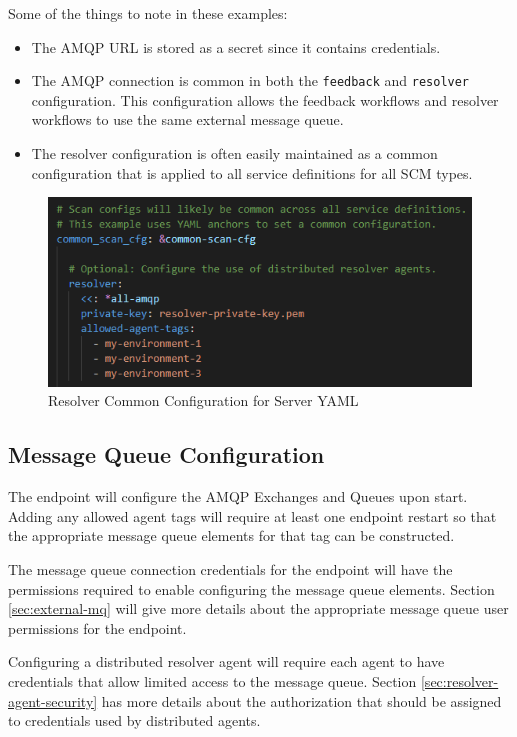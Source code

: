 Some of the things to note in these examples:

\begin{itemize}
  \item The AMQP URL is stored as a secret since it contains credentials.
  \item The AMQP connection is common in both the \texttt{feedback} and \texttt{resolver} configuration.
  This configuration allows the feedback workflows and resolver workflows to use the same external message queue.
  \item The resolver configuration is often easily maintained as a common configuration that is applied to 
  all service definitions for all SCM types.  
\end{itemize}


\begin{figure}[h]
    \includegraphics[width=\textwidth]{graphics/resolver-config-yaml.png}
    \caption{Resolver Common Configuration for Server YAML}
    \label{fig:resolver-config-yaml}
\end{figure}


\subsection{Message Queue Configuration}

The \cxoneflow endpoint will configure the AMQP Exchanges and Queues upon start.  Adding any
allowed agent tags will require at least one \cxoneflow endpoint restart so that the
appropriate message queue elements for that tag can be constructed.

The message queue connection credentials for the \cxoneflow endpoint will have the 
permissions required to enable configuring the message queue elements.  Section \ref{sec:external-mq}
will give more details about the appropriate message queue user permissions for the \cxoneflow endpoint.

Configuring a distributed resolver agent will require each agent to have credentials that allow limited
access to the message queue.  Section \ref{sec:resolver-agent-security} has more details about the
authorization that should be assigned to credentials used by distributed agents.

